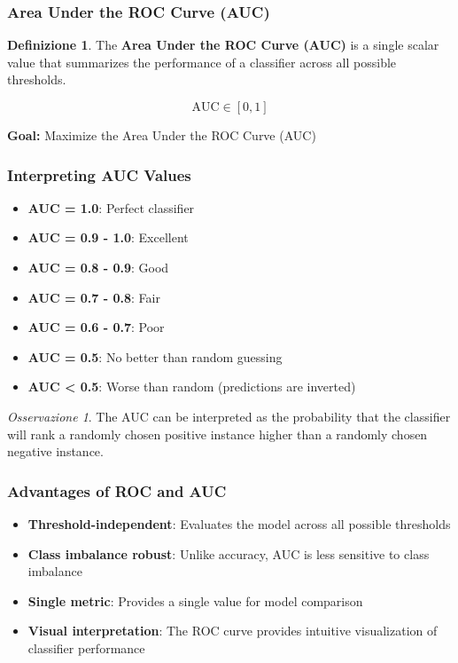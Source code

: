 \documentclass[11pt,a4paper]{article}
\theoremstyle{definition}
\newtheorem{definition}{Definizione}[section]
\theoremstyle{plain}
\theoremstyle{remark}
\newtheorem*{observation}{Osservazione}
\begin{document}
\subsubsection{Area Under the ROC Curve (AUC)}

\begin{definition}
The \textbf{Area Under the ROC Curve (AUC)} is a single scalar value that summarizes the performance of a classifier across all possible thresholds.

\begin{equation}
\text{AUC} \in [0, 1]
\end{equation}
\end{definition}

\begin{center}
\colorbox{orange!15}{\parbox{0.85\textwidth}{
\centering
\textbf{Goal:} Maximize the Area Under the ROC Curve (AUC)
}}
\end{center}

\subsubsection{Interpreting AUC Values}

\begin{itemize}
    \item \textbf{AUC = 1.0}: Perfect classifier
    \item \textbf{AUC = 0.9 - 1.0}: Excellent
    \item \textbf{AUC = 0.8 - 0.9}: Good
    \item \textbf{AUC = 0.7 - 0.8}: Fair
    \item \textbf{AUC = 0.6 - 0.7}: Poor
    \item \textbf{AUC = 0.5}: No better than random guessing
    \item \textbf{AUC < 0.5}: Worse than random (predictions are inverted)
\end{itemize}

\begin{observation}
The AUC can be interpreted as the probability that the classifier will rank a randomly chosen positive instance higher than a randomly chosen negative instance.
\end{observation}

\subsubsection{Advantages of ROC and AUC}

\begin{itemize}
    \item \textbf{Threshold-independent}: Evaluates the model across all possible thresholds
    \item \textbf{Class imbalance robust}: Unlike accuracy, AUC is less sensitive to class imbalance
    \item \textbf{Single metric}: Provides a single value for model comparison
    \item \textbf{Visual interpretation}: The ROC curve provides intuitive visualization of classifier performance
\end{itemize}
\end{document}
